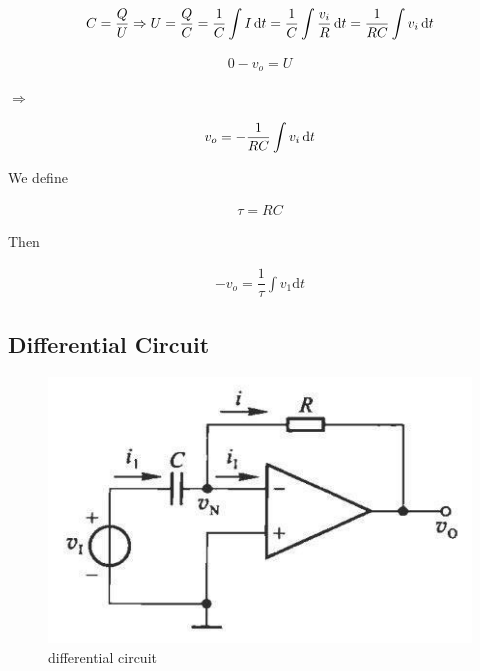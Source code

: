 \begin{equation*}
  \begin{aligned}
    C = \dfrac{Q}{U} \Rightarrow U = \dfrac{Q}{C} = \dfrac{1}{C} \int I \mathop{}\!\mathrm{d} t = \dfrac{1}{C} \int \dfrac{v_i}{R} \mathop{}\!\mathrm{d} t = \dfrac{1}{RC} \int v_i \mathop{}\!\mathrm{d} t
  \end{aligned}
\end{equation*}

\begin{equation*}
  \begin{aligned}
    0 - v_o = U
  \end{aligned}
\end{equation*}

$\Rightarrow$

\begin{equation*}
  \begin{aligned}
    v_o = - \dfrac{1}{RC} \int v_i \mathop{}\!\mathrm{d} t
  \end{aligned}
\end{equation*}

We define

\begin{equation*}
  \begin{aligned}
    \tau = RC
  \end{aligned}
\end{equation*}

Then

\begin{equation*}
  \begin{aligned}
    - v_o = \dfrac{1}{\tau} \int v_{1} \mathrm{d} t
  \end{aligned}
\end{equation*}

\subsection{Differential Circuit}

\begin{figure}[H]
  \centering
  \includegraphics[width=0.6\linewidth]{figures/differential-circuit}
  \caption{differential circuit}
  \label{fig:}
\end{figure}

